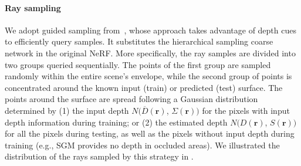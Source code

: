 \documentclass{isprs} %
\newcommand{\Nerf}{{NeRF}}
\begin{document}
\paragraph{Ray sampling}\label{para:sample} We adopt guided sampling from~\cite{roessle2022dense}, whose approach takes advantage of depth cues to efficiently query samples. %
It substitutes the hierarchical sampling coarse network in the original \Nerf. More specifically, the ray samples are divided into two groups queried sequentially. The  points of the first group are sampled randomly within the entire scene's envelope, while the second group of points is concentrated around the known input (train) or predicted (test) surface. The points around the surface are spread following a Gaussian distribution determined by (1) the input depth $N(\overline{D}(\textbf{r})$, $\Sigma(\textbf{r}))$ for the pixels with input depth information during training; or (2) the estimated depth $N(D(\textbf{r})$, $S(\textbf{r}))$ for all the pixels during testing, as well as the pixels without input depth during training (e.g., SGM provides no depth in occluded areas). We illustrated the distribution of the rays sampled by this strategy in .
%

\end{document}
